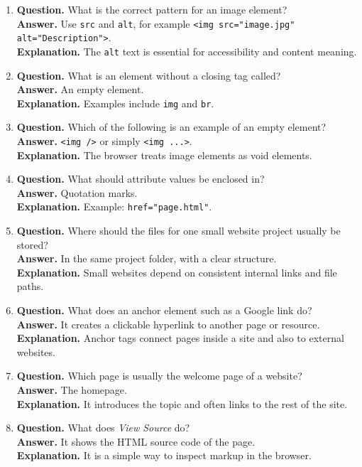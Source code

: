 \documentclass[11pt,a4paper]{article}
\begin{document}
\begin{enumerate}
  \item \textbf{Question.} What is the correct pattern for an image element?\\
  \textbf{Answer.} Use \texttt{src} and \texttt{alt}, for example \texttt{<img src="image.jpg"}\\
  \texttt{alt="Description">}.\\
  \textbf{Explanation.} The \texttt{alt} text is essential for accessibility and content meaning.

  \item \textbf{Question.} What is an element without a closing tag called?\\
  \textbf{Answer.} An empty element.\\
  \textbf{Explanation.} Examples include \texttt{img} and \texttt{br}.

  \item \textbf{Question.} Which of the following is an example of an empty element?\\
  \textbf{Answer.} \texttt{<img />} or simply \texttt{<img ...>}.\\
  \textbf{Explanation.} The browser treats image elements as void elements.

  \item \textbf{Question.} What should attribute values be enclosed in?\\
  \textbf{Answer.} Quotation marks.\\
  \textbf{Explanation.} Example: \texttt{href="page.html"}.

  \item \textbf{Question.} Where should the files for one small website project usually be stored?\\
  \textbf{Answer.} In the same project folder, with a clear structure.\\
  \textbf{Explanation.} Small websites depend on consistent internal links and file paths.

  \item \textbf{Question.} What does an anchor element such as a Google link do?\\
  \textbf{Answer.} It creates a clickable hyperlink to another page or resource.\\
  \textbf{Explanation.} Anchor tags connect pages inside a site and also to external websites.

  \item \textbf{Question.} Which page is usually the welcome page of a website?\\
  \textbf{Answer.} The homepage.\\
  \textbf{Explanation.} It introduces the topic and often links to the rest of the site.

  \item \textbf{Question.} What does \emph{View Source} do?\\
  \textbf{Answer.} It shows the HTML source code of the page.\\
  \textbf{Explanation.} It is a simple way to inspect markup in the browser.
\end{enumerate}
\end{document}
